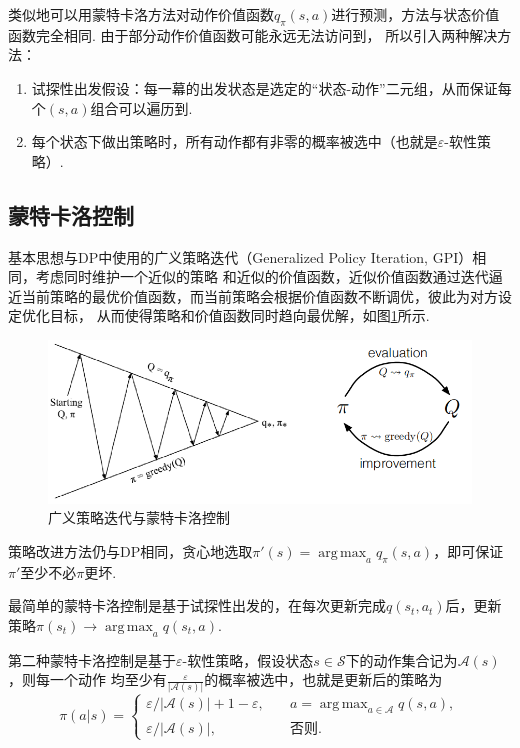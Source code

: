 \documentclass[12pt, a4paper, oneside]{ctexart}
\numberwithin{equation}{section}  %
\DeclareMathOperator*{\argmax}{arg\,max}  %
\def\S{\mathcal{S}}         %
\def\A{\mathcal{A}}         %
\begin{document}
类似地可以用蒙特卡洛方法对动作价值函数$q_{\pi}(s,a)$进行预测，方法与状态价值函数完全相同. 由于部分动作价值函数可能永远无法访问到，
所以引入两种解决方法：
\begin{enumerate}
    \item 试探性出发假设：每一幕的出发状态是选定的“状态-动作”二元组，从而保证每个$(s,a)$组合可以遍历到.
    \item 每个状态下做出策略时，所有动作都有非零的概率被选中（也就是$\varepsilon$-软性策略）.
\end{enumerate}
\subsection{蒙特卡洛控制}
基本思想与DP中使用的广义策略迭代（Generalized Policy Iteration, GPI）相同，考虑同时维护一个近似的策略
和近似的价值函数，近似价值函数通过迭代逼近当前策略的最优价值函数，而当前策略会根据价值函数不断调优，彼此为对方设定优化目标，
从而使得策略和价值函数同时趋向最优解，如图\ref{fig-广义策略迭代与蒙特卡洛控制}所示.
\begin{figure}[htbp]
    \centering
    \includegraphics[scale=0.6]{../figures/095页广义策略迭代与蒙特卡洛控制.png}
    \caption{广义策略迭代与蒙特卡洛控制}
    \label{fig-广义策略迭代与蒙特卡洛控制}
\end{figure}

策略改进方法仍与DP相同，贪心地选取$\pi'(s) = \argmax_{a}q_{\pi}(s,a)$，即可保证$\pi'$至少不必$\pi$更坏.

最简单的蒙特卡洛控制是基于试探性出发的，在每次更新完成$q(s_t, a_t)$后，更新策略$\pi(s_t)\rightarrow \argmax_{a}q(s_t, a)$.

第二种蒙特卡洛控制是基于$\varepsilon$-软性策略，假设状态$s\in\S$下的动作集合记为$\A(s)$，则每一个动作
均至少有$\frac{\varepsilon}{|\A(s)|}$的概率被选中，也就是更新后的策略为
\begin{equation*}
    \pi(a|s) = \begin{cases}
        \varepsilon / |\A(s)| + 1 - \varepsilon,&\quad a = \argmax_{a\in\A}q(s,a),\\
        \varepsilon / |\A(s)|,&\quad \text{否则}.
    \end{cases}
\end{equation*}
\end{document}
